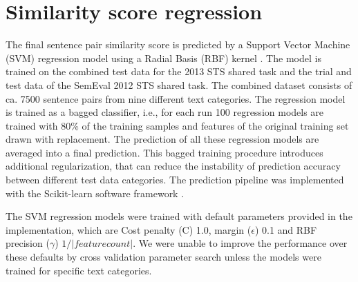 
\section{Similarity score regression}
\label{sec:regression}

The final sentence pair similarity score is predicted by a Support Vector Machine (SVM) regression model using a Radial Basis (RBF) kernel \cite{VapnikEA:97}. The model is trained on the combined test data for the 2013 STS shared task and the trial and test data of the SemEval 2012 STS shared task. The combined dataset consists of ca. 7500 sentence pairs from nine different text categories. The regression model is trained as a bagged classifier, i.e., for each run 100 regression models are trained with 80\% of the training samples and features of the original training set drawn with replacement. The prediction of all these regression models are averaged into a final prediction. This bagged training procedure introduces additional regularization, that can reduce the instability of prediction accuracy between different test data categories. The prediction pipeline was implemented with the Scikit-learn software framework \cite{scikit-learn}.

The SVM regression models were trained with default parameters provided in the implementation, which are Cost penalty (C) 1.0, margin ($\epsilon$) 0.1 and RBF precision ($\gamma$) $1/|feature count|$. We were unable to improve the performance over these defaults by cross validation parameter search unless the models were trained for specific text categories.

